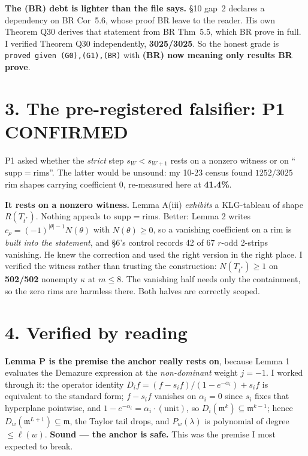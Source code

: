 \documentclass[11pt,a4paper]{article}
\theoremstyle{remark}
\begin{document}
\medskip
\noindent\textbf{The (BR) debt is lighter than the file says.} \S10 gap~2 declares a dependency
on BR Cor~5.6, whose proof BR leave to the reader. His own Theorem Q30 derives that statement
from BR Thm~5.5, which BR prove in full. I verified Theorem Q30 independently,
\textbf{3025/3025}. So the honest grade is \texttt{proved given (G0),(G1),(BR)} with
\textbf{(BR) now meaning only results BR prove}.

\section*{3. The pre-registered falsifier: P1 CONFIRMED}

P1 asked whether the \emph{strict} step $s_W<s_{W+1}$ rests on a nonzero witness or on
``$\mathrm{supp}=\mathrm{rims}$''. The latter would be unsound: my 10-23 census found
$1252/3025$ rim shapes carrying coefficient $0$, re-measured here at \textbf{41.4\%}.

\textbf{It rests on a nonzero witness.} Lemma A(iii) \emph{exhibits} a KLG-tableau of shape
$R(T_{t^*})$. Nothing appeals to $\mathrm{supp}=\mathrm{rims}$. Better: Lemma 2 writes
$c_\rho=(-1)^{|\theta|-1}N(\theta)$ with $N(\theta)\ge0$, so a vanishing coefficient on a rim is
\emph{built into the statement}, and \S6's control records 42 of 67 $r$-odd 2-strips vanishing.
He knew the correction and used the right version in the right place. I verified the witness
rather than trusting the construction: $N(T_{t^*})\ge1$ on \textbf{502/502} nonempty $\kappa$ at
$m\le8$. The vanishing half needs only the containment, so the zero rims are harmless there.
Both halves are correctly scoped.

\section*{4. Verified by reading}

\textbf{Lemma P is the premise the anchor really rests on}, because Lemma 1 evaluates the
Demazure expression at the \emph{non-dominant} weight $j=-1$. I worked through it: the operator
identity $D_if=(f-s_if)/(1-e^{-\alpha_i})+s_if$ is equivalent to the standard form; $f-s_if$
vanishes on $\alpha_i=0$ since $s_i$ fixes that hyperplane pointwise, and
$1-e^{-\alpha_i}=\alpha_i\cdot(\text{unit})$, so $D_i(\mathfrak{m}^k)\subseteq\mathfrak{m}^{k-1}$;
hence $D_w(\mathfrak{m}^{L+1})\subseteq\mathfrak{m}$, the Taylor tail drops, and $P_w(\lambda)$
is polynomial of degree $\le\ell(w)$. \textbf{Sound --- the anchor is safe.} This was the premise
I most expected to break.
\end{document}

